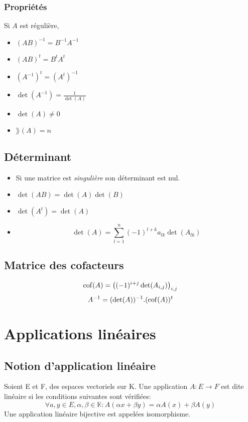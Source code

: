 \subsubsection{Propriétés}
Si $A$ est régulière,
\begin{itemize}
  \item $(AB)^{-1} = B^{-1}A^{-1}$
  \item $(AB)^t = B^tA^t$
  \item $(A^{-1})^t = (A^t)^{-1}$
  \item $\det(A^{-1}) = \frac{1}{\det(A)}$
  \item $\det(A) \neq 0$
  \item $\rang(A) = n$
\end{itemize}

\subsection{Déterminant}
\begin{itemize}
  \item Si une matrice est \emph{singulière} son déterminant est nul.
  \item $\det(AB) = \det(A) \det(B)$
  \item $\det(A^t) = \det(A)$
  \item \[ \det(A) = \sum_{l = 1}^{n}(-1)^{l+k}a_{lk}\det(A_{lk}) \]
\end{itemize}

\subsection{Matrice des cofacteurs}
\[ \operatorname{cof}(A) = \left((-1)^{i + j}\det(A_{i,j})\right)_{i,j} \]
\[ A^{-1} = (\det(A))^{-1} . (\operatorname{cof}(A))^t \]


\section{Applications linéaires}

\subsection{Notion d'application linéaire}
Soient E et F, des espaces vectoriels sur K.
Une application $A : E \rightarrow F$ est dite linéaire
si les conditions suivantes sont vérifiées:
\[ \forall a,y \in E, \alpha ,\beta \in\mathbb{K} :
A(\alpha{x} + \beta{y}) = \alpha{A(x)} + \beta{A(y)} \]
Une application linéaire bijective est appelées isomorphisme.

